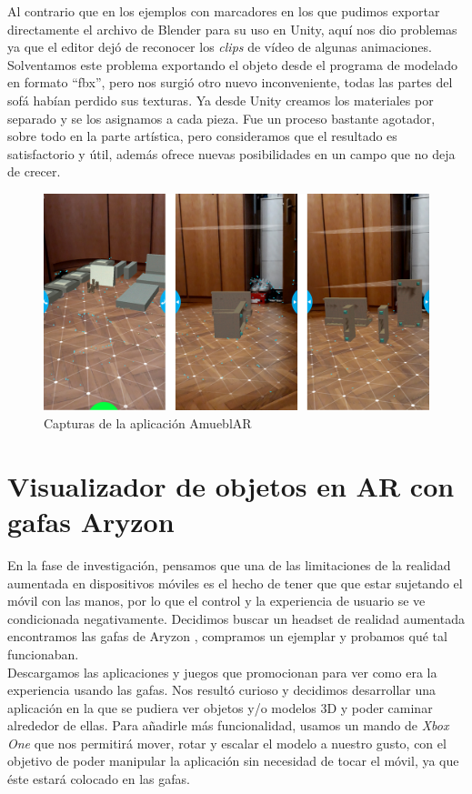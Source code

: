 Al contrario que en los ejemplos con marcadores en los que pudimos exportar directamente el archivo de Blender para su uso en Unity, aquí nos dio problemas ya que el editor dejó de reconocer los \textit{clips} de vídeo de algunas animaciones. Solventamos este problema exportando el objeto desde el programa de modelado en formato ``fbx'', pero nos surgió otro nuevo inconveniente, todas las partes del sofá habían perdido sus texturas. Ya desde Unity creamos los materiales por separado y se los asignamos a cada pieza.
Fue un proceso bastante agotador, sobre todo en la parte artística, pero consideramos que el resultado es satisfactorio y útil, además ofrece nuevas posibilidades en un campo que no deja de crecer.\\

\begin{figure}[H]
    \centering
    \includegraphics[width=\linewidth]{Images/amueblar.jpg}
    \caption{Capturas de la aplicación AmueblAR}
    \label{mueblAR}
\end{figure}

\clearpage
\section{Visualizador de objetos en AR con gafas Aryzon}
En la fase de investigación, pensamos que una de las limitaciones de la realidad aumentada en dispositivos móviles es el hecho de tener que que estar sujetando el móvil con las manos, por lo que el control y la experiencia de usuario se ve condicionada negativamente. Decidimos buscar un headset de realidad aumentada encontramos las gafas de Aryzon \cite{Aryzon}, compramos un ejemplar y probamos qué tal funcionaban.\\

Descargamos las aplicaciones y juegos que promocionan para ver como era la experiencia usando las gafas. Nos resultó curioso y decidimos desarrollar una aplicación en la que se pudiera ver objetos y/o modelos 3D y poder caminar alrededor de ellas. Para añadirle más funcionalidad, usamos un mando de \textit{Xbox One} que nos permitirá mover, rotar y escalar el modelo a nuestro gusto, con el objetivo de poder manipular la aplicación sin necesidad de tocar el móvil, ya que éste estará colocado en las gafas.\\

